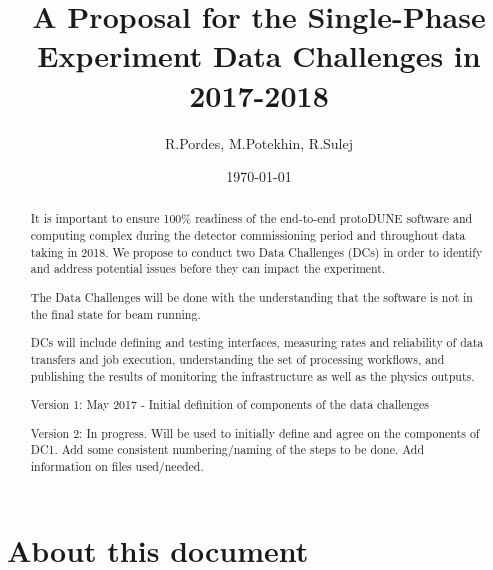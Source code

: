 \documentclass[pdftex,12pt,letter]{article}
\title{A Proposal for the Single-Phase \pd Experiment Data Challenges in 2017-2018}
\date{\today}
\author{R.Pordes, M.Potekhin, R.Sulej}
\newcommand{\pd}{protoDUNE\xspace}
\begin{document}
\maketitle

\begin{abstract}



\noindent It is important to ensure 100\% readiness of the
end-to-end \pd software and computing complex during the detector commissioning period and
throughout data taking in 2018. We propose to conduct two Data Challenges (DCs) in order to identify
and address potential issues before they can impact the experiment. 
\par
The Data Challenges will be done with the
understanding that the software is not in the final state for beam running. 
\par
DCs will include defining and  testing interfaces, measuring rates and reliability of data transfers and job execution, understanding the set of processing workflows, and publishing the results of monitoring the infrastructure as well as the physics outputs.


Version 1: May 2017 - Initial definition of components of the data challenges
\par

Version 2: In progress. Will be used to initially define and agree on the components of DC1. Add some consistent numbering/naming of the steps to be done. Add information on files used/needed.

\end{abstract}

\tableofcontents

\pagebreak

\section{About this document}
\end{document}
